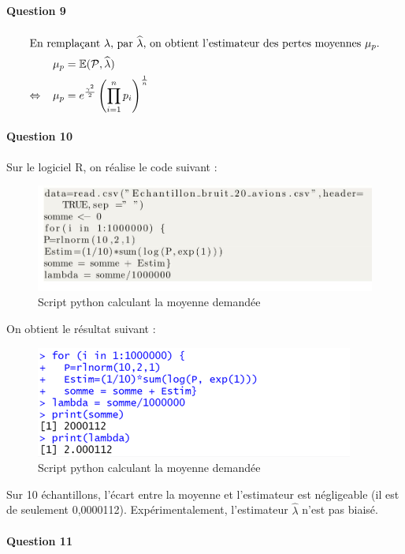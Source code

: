 \documentclass[oneside,a4paper,13pt]{book}
\begin{document}
\paragraph{Question 9}

\begin{align*}
\intertext{En remplaçant $\lambda$, par $\widehat{\lambda}$, on obtient l'estimateur des pertes moyennes $\mu_{p}$.}
    \mu_{p} &= \mathbb{E}(\mathcal{P}, \widehat{\lambda}) \\
    \Leftrightarrow \;\;\; \mu_{p} &= e^{\frac{\gamma^2}{2}}\left(\prod_{i=1}^{n} p_{i}\right)^\frac{1}{n}
\end{align*}


\paragraph{Question 10}
Sur le logiciel R, on réalise le code suivant : 

\begin{figure}[H]
\centering
  \includegraphics[width=0.8\linewidth]{src/q10-1.jpg}
  \caption{Script python calculant la moyenne demandée}
  \label{fig:q3}
\end{figure}

On obtient le résultat suivant : 
\begin{figure}[H]
\centering
  \includegraphics[width=0.8\linewidth]{src/q10-2.png}
  \caption{Script python calculant la moyenne demandée}
  \label{fig:q3}
\end{figure}
Sur 10 échantillons, l'écart entre la moyenne et l'estimateur est négligeable (il est de seulement 0,0000112). Expérimentalement, l'estimateur $\widehat{\lambda}$ n'est pas biaisé.

\paragraph{Question 11}
\end{document}
